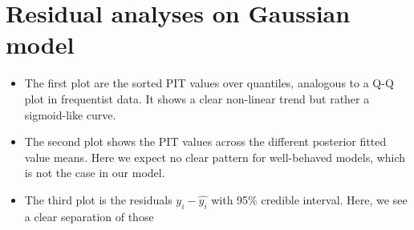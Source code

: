 \begin{Shaded}
\begin{Highlighting}[]
\OtherTok{\textless{}{-}} \NormalTok{(}
   \NormalTok{, } \NormalTok{,}
    \SpecialCharTok{*} \NormalTok{, }  \SpecialCharTok{*} 
\NormalTok{)}
\OtherTok{\textless{}{-}}\NormalTok{ ped0[, }\NormalTok{(}\NormalTok{, }\NormalTok{, }\NormalTok{)]}
\OtherTok{\textless{}{-}} \NormalTok{(}\NormalTok{, }\NormalTok{, }\NormalTok{)}
\OtherTok{\textless{}{-}}\SpecialCharTok{::}
               \NormalTok{)}
  \NormalTok{(}\NormalTok{,}
     \NormalTok{, } \NormalTok{, } 
\NormalTok{  )}
\NormalTok{\}}
\NormalTok{(d.ped[, }\NormalTok{(}\NormalTok{, }\NormalTok{, }\NormalTok{)],}
              \NormalTok{)}
  \NormalTok{(}\NormalTok{,}
     \NormalTok{, } \NormalTok{, } 
\NormalTok{  )}
\NormalTok{\}}
\end{Highlighting}
\end{Shaded}

\hypertarget{residual-analyses-on-gaussian-model}{%
\section*{Residual analyses on Gaussian
model}\label{residual-analyses-on-gaussian-model}}

\begin{itemize}
\tightlist
\item
  The first plot are the sorted PIT values over quantiles, analogous to
  a Q-Q plot in frequentist data. It shows a clear non-linear trend but
  rather a sigmoid-like curve.
\item
  The second plot shows the PIT values across the different posterior
  fitted value means. Here we expect no clear pattern for well-behaved
  models, which is not the case in our model.
\item
  The third plot is the residuals \(y_i - \hat{y_i}\) with 95\% credible
  interval. Here, we see a clear separation of those
\end{itemize}

